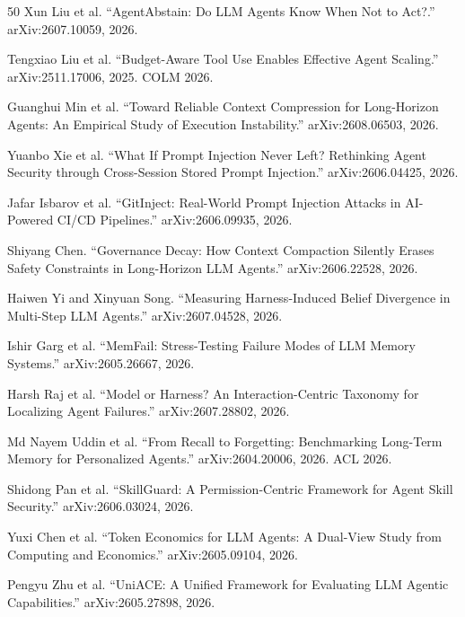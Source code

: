\begin{thebibliography}{50}
Xun Liu et al.
``AgentAbstain: Do LLM Agents Know When Not to Act?.''
arXiv:2607.10059, 2026.

Tengxiao Liu et al.
``Budget-Aware Tool Use Enables Effective Agent Scaling.''
arXiv:2511.17006, 2025. COLM 2026.

Guanghui Min et al.
``Toward Reliable Context Compression for Long-Horizon Agents: An Empirical Study of Execution Instability.''
arXiv:2608.06503, 2026.

Yuanbo Xie et al.
``What If Prompt Injection Never Left? Rethinking Agent Security through Cross-Session Stored Prompt Injection.''
arXiv:2606.04425, 2026.

Jafar Isbarov et al.
``GitInject: Real-World Prompt Injection Attacks in AI-Powered CI/CD Pipelines.''
arXiv:2606.09935, 2026.

Shiyang Chen.
``Governance Decay: How Context Compaction Silently Erases Safety Constraints in Long-Horizon LLM Agents.''
arXiv:2606.22528, 2026.

Haiwen Yi and Xinyuan Song.
``Measuring Harness-Induced Belief Divergence in Multi-Step LLM Agents.''
arXiv:2607.04528, 2026.

Ishir Garg et al.
``MemFail: Stress-Testing Failure Modes of LLM Memory Systems.''
arXiv:2605.26667, 2026.

Harsh Raj et al.
``Model or Harness? An Interaction-Centric Taxonomy for Localizing Agent Failures.''
arXiv:2607.28802, 2026.

Md Nayem Uddin et al.
``From Recall to Forgetting: Benchmarking Long-Term Memory for Personalized Agents.''
arXiv:2604.20006, 2026. ACL 2026.

Shidong Pan et al.
``SkillGuard: A Permission-Centric Framework for Agent Skill Security.''
arXiv:2606.03024, 2026.

Yuxi Chen et al.
``Token Economics for LLM Agents: A Dual-View Study from Computing and Economics.''
arXiv:2605.09104, 2026.

Pengyu Zhu et al.
``UniACE: A Unified Framework for Evaluating LLM Agentic Capabilities.''
arXiv:2605.27898, 2026.
\end{thebibliography}

